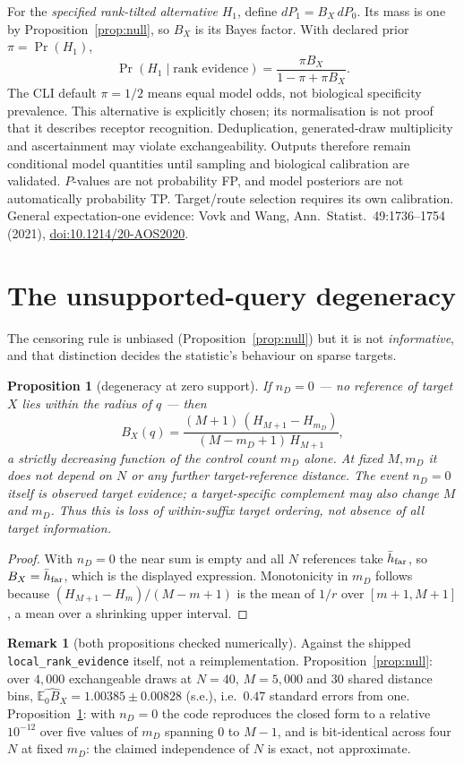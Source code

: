 \documentclass[10pt,a4paper]{article}
\newtheorem{proposition}{Proposition}
\theoremstyle{definition}
\newtheorem{remark}{Remark}
\newcommand{\E}{\mathbb{E}}
\newcommand{\code}[1]{\texttt{\small #1}}
\begin{document}
For the \emph{specified rank-tilted alternative} $H_1$, define $dP_1=B_X\,dP_0$. Its mass is one by
Proposition~\ref{prop:null}, so $B_X$ is its Bayes factor. With declared prior $\pi=\Pr(H_1)$,
\[
\boxed{\Pr(H_1\mid\text{rank evidence})=\frac{\pi B_X}{1-\pi+\pi B_X}.}
\]
The CLI default $\pi=1/2$ means equal model odds, not biological specificity prevalence. This
alternative is explicitly chosen; its normalisation is not proof that it describes receptor
recognition. Deduplication, generated-draw multiplicity and ascertainment may violate
exchangeability. Outputs therefore remain conditional model quantities until sampling and
biological calibration are validated. $P$-values are not probability FP, and model posteriors are
not automatically probability TP. Target/route selection requires its own calibration. General
expectation-one evidence: Vovk and Wang, Ann.\ Statist.\ 49:1736--1754 (2021),
\href{https://doi.org/10.1214/20-AOS2020}{doi:10.1214/20-AOS2020}.

\section{The unsupported-query degeneracy}\label{sec:degen}
The censoring rule is unbiased (Proposition~\ref{prop:null}) but it is not \emph{informative}, and
that distinction decides the statistic's behaviour on sparse targets.

\begin{proposition}[degeneracy at zero support]\label{prop:degen}
If $n_D=0$ --- no reference of target $X$ lies within the radius of $q$ --- then
\[
B_X(q)=\frac{(M+1)\,(H_{M+1}-H_{m_D})}{(M-m_D+1)\,H_{M+1}},
\]
a strictly decreasing function of the control count $m_D$ \emph{alone}. At fixed $M,m_D$ it does not depend on $N$ or any further target-reference distance.
The event $n_D=0$ itself is observed target evidence; a target-specific complement may also change
$M$ and $m_D$. Thus this is loss of within-suffix target ordering, not absence of all target information.
\end{proposition}
\begin{proof}
With $n_D=0$ the near sum is empty and all $N$ references take $\bar h_{\rm far}$, so
$B_X=\bar h_{\rm far}$, which is the displayed expression. Monotonicity in $m_D$ follows because
$(H_{M+1}-H_{m})/(M-m+1)$ is the mean of $1/r$ over $[m+1,M+1]$, a mean over a shrinking
upper interval.
\end{proof}

\begin{remark}[both propositions checked numerically]
Against the shipped \code{local\_rank\_evidence} itself, not a reimplementation.
Proposition~\ref{prop:null}: over $4{,}000$ exchangeable draws at $N=40$, $M=5{,}000$ and $30$ shared
distance bins, $\widehat{\E_0 B_X}=1.00385\pm0.00828$ (s.e.), i.e.\ $0.47$ standard errors from one.
Proposition~\ref{prop:degen}: with $n_D=0$ the code reproduces the closed form to a relative
$10^{-12}$ over five values of $m_D$ spanning $0$ to $M-1$, and is bit-identical across four $N$
at fixed $m_D$: the claimed independence of $N$ is exact, not approximate.
\end{remark}
\end{document}
